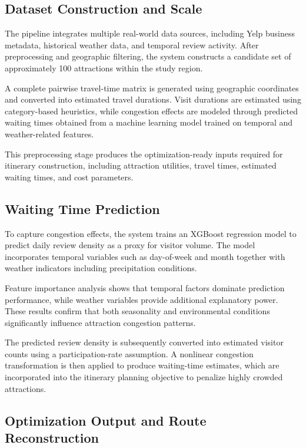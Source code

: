 \documentclass[12pt,a4paper]{article}
\begin{document}
\subsection{Dataset Construction and Scale}

The pipeline integrates multiple real-world data sources, including Yelp business metadata, historical weather data, and temporal review activity. After preprocessing and geographic filtering, the system constructs a candidate set of approximately 100 attractions within the study region.

A complete pairwise travel-time matrix is generated using geographic coordinates and converted into estimated travel durations. Visit durations are estimated using category-based heuristics, while congestion effects are modeled through predicted waiting times obtained from a machine learning model trained on temporal and weather-related features.

This preprocessing stage produces the optimization-ready inputs required for itinerary construction, including attraction utilities, travel times, estimated waiting times, and cost parameters.

\subsection{Waiting Time Prediction}

To capture congestion effects, the system trains an XGBoost regression model to predict daily review density as a proxy for visitor volume. The model incorporates temporal variables such as day-of-week and month together with weather indicators including precipitation conditions.

Feature importance analysis shows that temporal factors dominate prediction performance, while weather variables provide additional explanatory power. These results confirm that both seasonality and environmental conditions significantly influence attraction congestion patterns.

The predicted review density is subsequently converted into estimated visitor counts using a participation-rate assumption. A nonlinear congestion transformation is then applied to produce waiting-time estimates, which are incorporated into the itinerary planning objective to penalize highly crowded attractions.

\subsection{Optimization Output and Route Reconstruction}
\end{document}
